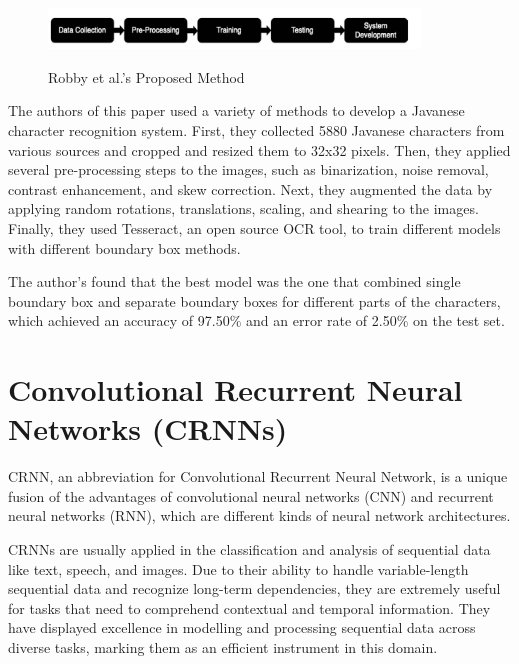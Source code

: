 \begin{figure}[ht]
    \centering
    \includegraphics[width=0.88\textwidth]{Figures/tesseract_papers/Robby_2019.jpg}
    \caption[Robby et al.'s Proposed Method]{Robby et al.'s Proposed Method}\cite{robbyImplementationOpticalCharacter2019}
    \label{fig:Robby et al.'s Proposed Method}
\end{figure}


The authors of this paper used a variety of methods to develop a Javanese character recognition system. First, they collected 5880 Javanese characters from various sources and cropped and resized them to 32x32 pixels. Then, they applied several pre-processing steps to the images, such as binarization, noise removal, contrast enhancement, and skew correction. Next, they augmented the data by applying random rotations, translations, scaling, and shearing to the images. Finally, they used Tesseract, an open source OCR tool, to train different models with different boundary box methods.

The author's found that the best model was the one that combined single boundary box and separate boundary boxes for different parts of the characters, which achieved an accuracy of 97.50\% and an error rate of 2.50\% on the test set.


\newpage
\section{Convolutional Recurrent Neural Networks (CRNNs)}

CRNN, an abbreviation for Convolutional Recurrent Neural Network, is a unique fusion of the advantages of convolutional neural networks (CNN) and recurrent neural networks (RNN), which are different kinds of neural network architectures.

CRNNs are usually applied in the classification and analysis of sequential data like text, speech, and images. Due to their ability to handle variable-length sequential data and recognize long-term dependencies, they are extremely useful for tasks that need to comprehend contextual and temporal information. They have displayed excellence in modelling and processing sequential data across diverse tasks, marking them as an efficient instrument in this domain.\cite{vermaImprovementOCRTechnologies2022}

